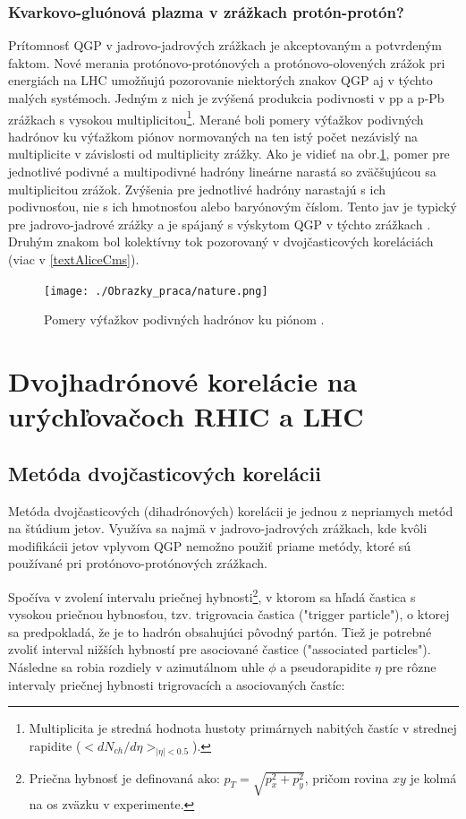 \documentclass[thesismargins, thesislinespacing]{rnthesis}
\begin{document}
\subsection{Kvarkovo-gluónová plazma v zrážkach protón-protón?}
Prítomnosť QGP v jadrovo-jadrových zrážkach je akceptovaným a potvrdeným faktom. Nové merania protónovo-protónových a protónovo-olovených zrážok pri energiách na LHC umožňujú pozorovanie niektorých znakov QGP aj v týchto malých systémoch. Jedným z nich je zvýšená produkcia podivnosti v pp a p-Pb zrážkach s vysokou multiplicitou\footnote{Multiplicita je stredná hodnota hustoty primárnych nabitých častíc v strednej rapidite   \newline  ($<dN_{ch}/d\eta>_{|\eta|<0.5}$).}. Merané boli pomery výťažkov podivných hadrónov ku výťažkom piónov normovaných na ten istý počet nezávislý na multiplicite v závislosti od multiplicity zrážky. Ako je vidieť na obr.\ref{strange}, pomer pre jednotlivé podivné a  multipodivné hadróny lineárne narastá so zväčšujúcou sa multiplicitou zrážok. Zvýšenia pre jednotlivé hadróny narastajú s ich podivnosťou, nie s ich hmotnosťou alebo baryónovým číslom. Tento jav je typický pre jadrovo-jadrové zrážky a je spájaný s výskytom QGP v týchto zrážkach \cite{nature}.  Druhým znakom bol kolektívny tok pozorovaný v dvojčasticových koreláciách (viac v \ref{textAliceCms}).
\begin{figure}[hbtp!]
	\begin{center}
		\texttt{[image: ./Obrazky\_praca/nature.png]}
		\caption{ Pomery výťažkov podivných hadrónov ku piónom \cite{nature}.}
		\label{strange}
	\end{center}
\end{figure} 

\chapter{Dvojhadrónové korelácie na urýchľovačoch RHIC a LHC}

\section{Metóda dvojčasticových korelácii}
\label{korel}
Metóda dvojčasticových (dihadrónových) korelácii je jednou z nepriamych metód na štúdium jetov. Využíva sa najmä v jadrovo-jadrových zrážkach, kde kvôli \-mo\-di\-fi\-ká\-cii jetov vplyvom QGP nemožno použiť priame metódy, ktoré sú používané pri protónovo-protónových zrážkach.

Spočíva v zvolení intervalu priečnej hybnosti\footnote{Priečna hybnosť je definovaná ako: $p_T=\sqrt{p_x^2+p_y^2}$, pričom rovina $xy$ je kolmá na os zväzku v experimente.}, v ktorom sa hľadá častica s vysokou priečnou hybnosťou, tzv. trigrovacia častica ("trigger particle"), o ktorej sa predpokladá, že je to hadrón obsahujúci pôvodný partón. Tiež je potrebné zvoliť interval nižších hybností pre asociované častice ("\-associated particles"). Následne sa robia rozdiely v \-a\-zi\-mu\-tál\-nom uhle $\phi$ a pseudorapidite $\eta$ pre rôzne intervaly priečnej hybnosti trigrovacích a asociovaných častíc:
\end{document}
